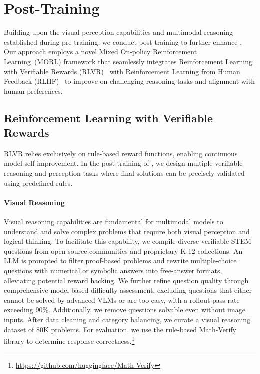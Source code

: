 \section{Post-Training}
Building upon the visual perception capabilities and multimodal reasoning established during pre-training, we conduct post-training to further enhance \mimovl{}. 
Our approach employs a novel Mixed On-policy Reinforcement Learning~(MORL) framework that seamlessly integrates Reinforcement Learning with Verifiable Rewards (RLVR)~\citep{shao2024deepseekmath,lambert2025tulu3pushingfrontiers} with Reinforcement Learning from Human Feedback (RLHF)~\citep{ouyang2022instructgpt} to improve \mimovl{} on challenging reasoning tasks and alignment with human preferences.

\subsection{Reinforcement Learning with Verifiable Rewards}


RLVR relies exclusively on rule-based reward functions, enabling continuous model self-improvement. In the post-training of \mimovl{}, we design multiple verifiable reasoning and perception tasks where final solutions can be precisely validated using predefined rules.


\paragraph{Visual Reasoning} 
Visual reasoning capabilities are fundamental for multimodal models to understand and solve complex problems that require both visual perception and logical thinking. To facilitate this capability, we compile diverse verifiable STEM questions from open-source communities and proprietary K-12 collections. 
An LLM is prompted to filter proof-based problems and rewrite multiple-choice questions with numerical or symbolic answers into free-answer formats, alleviating potential reward hacking.
We further refine question quality through comprehensive model-based difficulty assessment, excluding questions that either cannot be solved by advanced VLMs or are too easy, with a \mimovl{} rollout pass rate exceeding 90\%.
Additionally, we remove questions solvable even without image inputs. After data cleaning and category balancing, we curate a visual reasoning dataset of 80K problems. For evaluation, we use the rule-based Math-Verify library to determine response correctness.\footnote{\url{https://github.com/huggingface/Math-Verify}}

